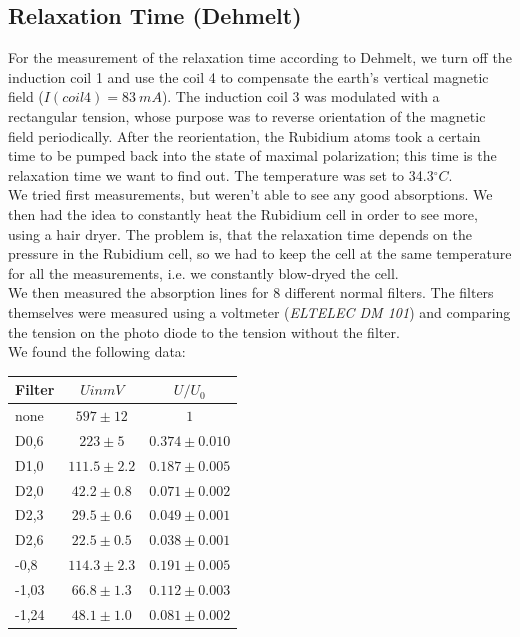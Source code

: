 \subsection{Relaxation Time (Dehmelt)}

For the measurement of the relaxation time according to Dehmelt, we turn off the induction coil 1 and use the coil 4 to compensate the earth's vertical magnetic field ($I(coil4) = 83\ mA$). The induction coil 3 was modulated with a rectangular tension, whose purpose was to reverse orientation of the magnetic field periodically. After the reorientation, the Rubidium atoms took a certain time to be pumped back into the state of maximal polarization; this time is the relaxation time we want to find out. The temperature was set to 34.3$^\circ C$.\\

We tried first measurements, but weren't able to see any good absorptions. We then had the idea to constantly heat the Rubidium cell in order to see more, using a hair dryer. The problem is, that the relaxation time depends on the pressure in the Rubidium cell, so we had to keep the cell at the same temperature for all the measurements, i.e. we constantly blow-dryed the cell.\\

We then measured the absorption lines for 8 different normal filters. The filters themselves were measured using a voltmeter (\emph{ELTELEC DM 101}) and comparing the tension on the photo diode to the tension without the filter.\\

We found the following data:

\begin{center}
\begin{tabular}[H]{l | c c}
Filter & $U in mV$ & $U/U_0$ \\ \hline
none & $597 \pm 12$ &    $1$\\
D0,6 & $223 \pm 5$ &        $0.374 \pm 0.010$ \\
D1,0 & $111.5 \pm 2.2$ & $ 0.187 \pm 0.005$ \\
D2,0 & $42.2 \pm 0.8$ &   $ 0.071 \pm 0.002$\\
D2,3 & $29.5 \pm 0.6$ &   $ 0.049 \pm 0.001$\\
D2,6 & $22.5 \pm 0.5$ &    $0.038 \pm 0.001$\\
-0,8  & $114.3 \pm 2.3$ &  $0.191 \pm 0.005$\\
-1,03 & $66.8 \pm 1.3 $&   $0.112 \pm 0.003$\\
-1,24 & $48.1 \pm 1.0$ &   $0.081 \pm 0.002$\\
\end{tabular}
\end{center}

